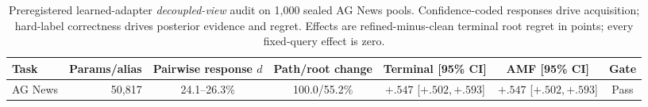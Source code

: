 \begin{table}[H]
\centering
\caption{Preregistered learned-adapter \emph{decoupled-view} audit on 1,000 sealed AG News pools. Confidence-coded responses drive acquisition; hard-label correctness drives posterior evidence and regret. Effects are refined-minus-clean terminal root regret in points; every fixed-query effect is zero.}
\label{tab:step92-learned-adapter}
\scriptsize
\setlength{\tabcolsep}{3.5pt}
\begin{tabular}{@{}l r c c c c c@{}}
\toprule
Task & Params/alias & Pairwise response $d$ & Path/root change & Terminal [95\% CI] & AMF [95\% CI] & Gate \\
\midrule
AG News & 50,817 & 24.1--26.3\% & 100.0/55.2\% & $+.547$ [$+.502,+.593$] & $+.547$ [$+.502,+.593$] & Pass \\
\bottomrule
\end{tabular}
\end{table}
